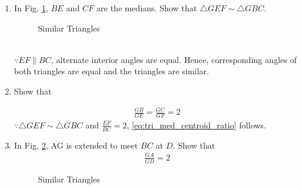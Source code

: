 %
\renewcommand{\theequation}{\theenumi}
\begin{enumerate}[label=\arabic*.,ref=\thesubsection.\theenumi]

\item	In Fig. \ref{fig:tri_med_centroid}, $BE$ and $CF$ are the medians. Show that $\triangle GEF \sim \triangle GBC$.
%
\begin{figure}[!ht]
	\begin{center}
		\resizebox{\columnwidth}{!}{}
	\end{center}
	\caption{Similar Triangles}
	\label{fig:tri_med_centroid}	
\end{figure}
\\
\solution $\because EF \parallel BC$, alternate interior angles are equal.  Hence, corresponding angles of both triangles are equal and the triangles are similar.
\item Show that

	\begin{align}
\label{eq:tri_med_centroid_ratio}
	\frac{GB}{GE} = \frac{GC}{GF} = 2
	\end{align}
%
\solution $\because \triangle GEF \sim \triangle GBC$ and $\frac{EF}{BC} =2$, \eqref{eq:tri_med_centroid_ratio} follows.
%
\item In Fig. \ref{fig:tri_med_meet}, AG is extended to meet $BC$ at $D$.	Show that 
	\begin{align}
\label{eq:tri_med_centroid_ratio_AD}
\frac{GA}{GD} = 2
	\end{align}
\begin{figure}[!ht]
	\begin{center}
		\resizebox{\columnwidth}{!}{}
	\end{center}
	\caption{Similar Triangles}
	\label{fig:tri_med_meet}	
\end{figure}


\end{enumerate}
